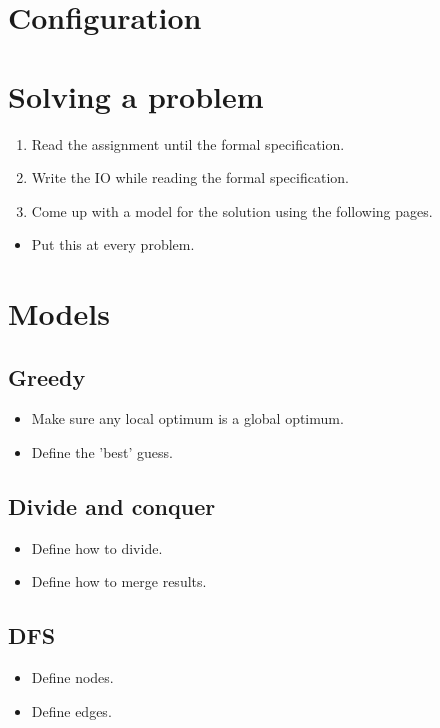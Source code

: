\documentclass[guide.tex]{subfiles}
\begin{document}
\section{Configuration}



\section{Solving a problem}

{\Huge

\begin{enumerate}
  \item Read the assignment until the formal specification.
  \item Write the IO while reading the formal specification.
  \item Come up with a model for the solution using the following pages.
\end{enumerate}

}

\begin{itemize}
\item Put this at every problem.
  \newline {}
\end{itemize}
\pagebreak

\section{Models}
\subsection{Greedy}
\begin{itemize}
  \item Make sure any local optimum is a global optimum.
  \item Define the 'best' guess.
\end{itemize}

\subsection{Divide and conquer}
\begin{itemize}
  \item Define how to divide.
  \item Define how to merge results.
\end{itemize}

\subsection{DFS}
\begin{itemize}
  \item Define nodes.
  \item Define edges.
\end{itemize}
\end{document}
